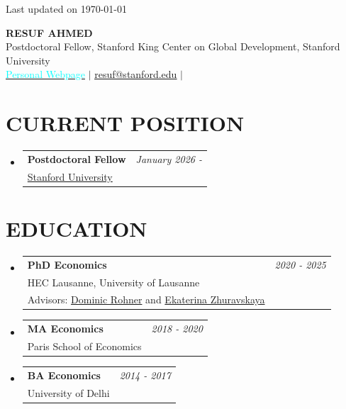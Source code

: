 \documentclass[letterpaper,11pt]{article}
\makeatletter
\newcommand{\updateinfo}[1][\today]{\par\vfill\hfill{\scriptsize\color{gray}Last updated on #1}}
\newcommand{\resumeSubheading}[4]{
  \vspace{-2pt}\item
    \begin{tabular*}{0.97\textwidth}[t]{l@{\extracolsep{\fill}}r}
      \textbf{#1} & #2 \\
      \small#3 & \small #4 \\
    \end{tabular*}\vspace{-7pt}
}
\newcommand{\resumeSubHeadingListStart}{\begin{itemize}[leftmargin=0.15in, label={}]}
\newcommand{\resumeSubHeadingListEnd}{\end{itemize}}
\makeatother
\begin{document}
\updateinfo
\vspace{-0.6cm}
\begin{center}
    \textbf{\huge \scshape RESUF AHMED} \\ \vspace{3pt}
    \small Postdoctoral Fellow, Stanford King Center on Global Development, Stanford University\\
    \small \href{https://resuf.github.io/}{\textcolor{cyan}{Personal Webpage}} $|$ \href{mailto:resuf@stanford.edu}{\underline{resuf@stanford.edu}} $|$
    \href{https://github.com/resuf/}{\faGithub} 
    \href{https://twitter.com/resuf_ahmed}{\faTwitter}
\end{center}

\section{\textbf{CURRENT POSITION}}
\resumeSubHeadingListStart

\resumeSubheading
      {\textbf{Postdoctoral Fellow}}{\textit{January 2026 -}}
      {\href{https://kingcenter.stanford.edu/postdoctoral-fellows}{Stanford University}
}{}
\vspace{0.2cm}

  \resumeSubHeadingListEnd

\section{\textbf{EDUCATION}}
\resumeSubHeadingListStart

\resumeSubheading
      {\textbf{PhD Economics}}{\textit{2020 - 2025}}
      {HEC Lausanne, University of Lausanne\\ Advisors:
 \href{https://sites.google.com/site/dprohner/}{Dominic Rohner} and \href{http://www.parisschoolofeconomics.com/zhuravskaya-ekaterina/}{Ekaterina Zhuravskaya}
}{}
\vspace{0.2cm}


\resumeSubheading
{\textbf{MA Economics}}{\textit{2018 - 2020}}
{Paris School of Economics
}{}

\vspace{0.2cm}
\resumeSubheading
{\textbf{BA Economics}}{\textit{2014 - 2017}}
{University of Delhi}{}
  \resumeSubHeadingListEnd

\vspace{0.3cm}
\end{document}
